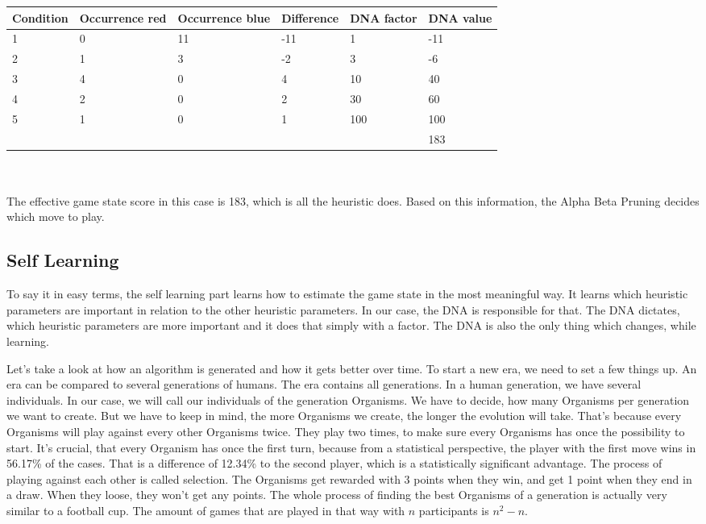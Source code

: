\begin{tabularx}{\textwidth}{|X|X|X|X|X|X|}
\hline
Condition & Occurrence red & Occurrence blue & Difference & DNA factor & DNA value \\\hline
1	& 0	& 11	& -11	& 1 	& -11 \\\hline
2	& 1	& 3 	& -2	& 3 	& -6 \\\hline
3	& 4	& 0 	& 4 	& 10	& 40 \\\hline
4	& 2	& 0 	& 2 	& 30	& 60 \\\hline
5	& 1	& 0 	& 1 	& 100	& 100 \\\hline
\multicolumn{5}{X|}{} & 183 \\\cline{6-6}
\end{tabularx}\\
\\
The effective game state score in this case is 183, which is all the heuristic does. 
Based on this information, the Alpha Beta Pruning decides which move to play.



\subsection{Self Learning}
To say it in easy terms, the self learning part learns how to estimate the game state in the most meaningful way. It learns which heuristic parameters are important in relation to the other heuristic parameters. In our case, the DNA  is responsible for that. The DNA dictates, which heuristic parameters are more important and it does that simply with a factor. The DNA is also the only thing which changes, while learning. 

Let's take a look at how an algorithm is generated and how it gets better over time.
To start a new era, we need to set a few things up. An era can be compared to several generations of humans. 
The era contains all generations. In a human generation, we have several individuals. In our case, we will call our individuals of the generation Organisms. We have to decide, how many Organisms per generation we want to create. But we have to keep in mind, the more Organisms we create, the longer the evolution will take. That's because every Organisms will play against every other Organisms twice. They play two times, to make sure every Organisms has once the possibility to start. It's crucial, that every Organism has once the first turn, because from a statistical perspective, the player with the first move wins in 56.17\% of the cases. That is a difference of 12.34\% to the second player, which is a statistically significant advantage. \cite{web:tsurel2013}
The process of playing against each other is called selection. The Organisms get rewarded with 3 points when they win, and get 1 point when they end in a draw. When they loose, they won't get any points. The whole process of finding the best Organisms of a generation is actually very similar to a football cup.
The amount of games that are played in that way with $n$ participants is $n^2-n$.

